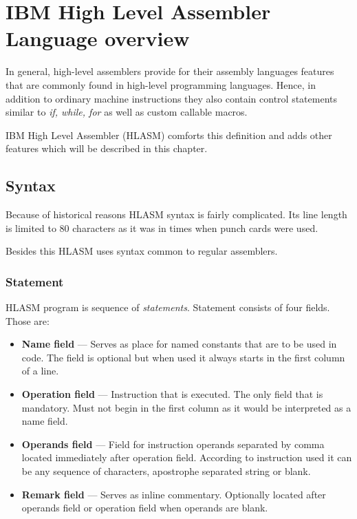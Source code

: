 \chapter{IBM High Level Assembler Language overview}

In general, high-level assemblers provide for their assembly languages features that are commonly found in high-level programming languages. Hence, in addition to ordinary machine instructions they also contain control statements similar to \textit{if, while, for} as well as custom callable macros.

IBM High Level Assembler (HLASM) comforts this definition and adds other features which will be described in this chapter.

\section{Syntax}

Because of historical reasons HLASM syntax is fairly complicated. Its line length is limited to 80 characters as it was in times when punch cards were used. 

Besides this HLASM uses syntax common to regular assemblers.

\subsection{Statement}

HLASM program is sequence of \textit{statements}. Statement consists of four fields. Those are:
\begin{itemize}
	\item \textbf{Name field} --- Serves as place for named constants that are to be used in code. The field is optional but when used it always starts in the first column of a line.
	
	\item \textbf{Operation field} --- Instruction that is executed. The only field that is mandatory. Must not begin in the first column as it would be interpreted as a name field.
	
	\item \textbf{Operands field} --- Field for instruction operands separated by comma located immediately after operation field. According to instruction used it can be any sequence of characters, apostrophe separated string or blank. 
	
	\item \textbf{Remark field} --- Serves as inline commentary. Optionally located after operands field or operation field when operands are blank.
\end{itemize}

